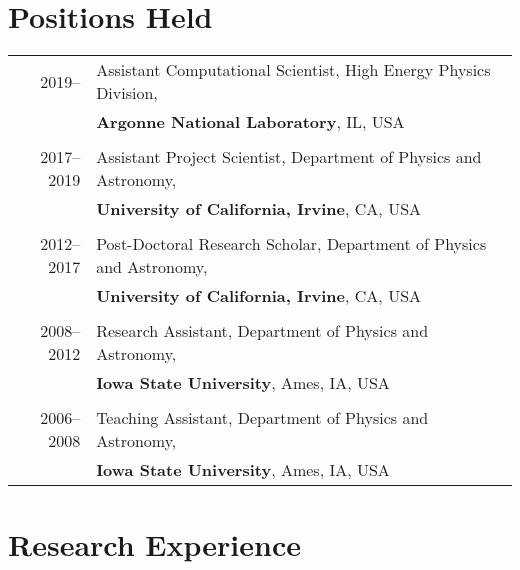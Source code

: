 \documentclass[a4paper,10pt]{article}
\begin{document}
\section{Positions Held}
\begin{tabular}{r|p{15.5cm}}
\textsc{2019--\phantom{0000}}		&		Assistant Computational Scientist, High Energy Physics Division,		\\
							&		{\bf Argonne National Laboratory}, IL, USA  						\\
\multicolumn{2}{c}{} \\
\textsc{2017--2019}				&		Assistant Project Scientist, Department of Physics and Astronomy, 		\\
							&		{\bf University of California, Irvine}, CA, USA  						\\
\multicolumn{2}{c}{} \\
\textsc{2012--2017}				&		Post-Doctoral Research Scholar, Department of Physics and Astronomy, 	\\
							&		{\bf University of California, Irvine}, CA, USA  						\\
\multicolumn{2}{c}{} \\
\textsc{2008--2012}				&		Research Assistant, Department of Physics and Astronomy, 			\\
							&		{\bf Iowa State University}, Ames, IA, USA 						\\
\multicolumn{2}{c}{} \\
\textsc{2006--2008}				&		Teaching Assistant, Department of Physics and Astronomy, 			\\
							&		{\bf Iowa State University}, Ames, IA, USA 						\\
\end{tabular}

\section{Research Experience}
\vspace{1mm}
\end{document}

